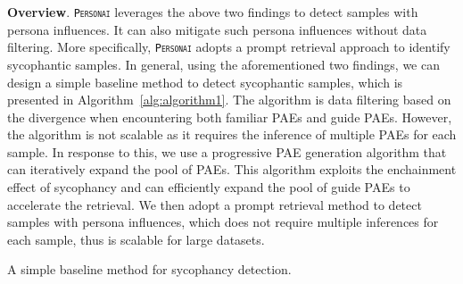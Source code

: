 {\textbf{Overview}. \texttt{\textsc{Personai}} leverages the above two findings to detect samples with persona influences. It can also mitigate such persona influences without data filtering. More specifically, \texttt{\textsc{Personai}} adopts a prompt retrieval approach to identify sycophantic samples. In general, using the aforementioned two findings, we can design a simple baseline method to detect sycophantic samples, which is presented in Algorithm~\ref{alg:algorithm1}. The algorithm is data filtering based on the divergence when encountering both familiar PAEs and guide PAEs. However, the algorithm is not scalable as it requires the inference of multiple PAEs for each sample. In response to this, we use a progressive PAE generation algorithm that can iteratively expand the pool of PAEs. This algorithm exploits the enchainment effect of sycophancy and can efficiently expand the pool of guide PAEs to accelerate the retrieval. We then adopt a prompt retrieval method to detect samples with persona influences, which does not require multiple inferences for each sample, thus is scalable for large datasets. 
\begin{algorithm}[!t]
\SetNoFillInSpace
\SetAlgoVspace{0.1 cm}
\SetNColorOnly
  \LinesNumbered
  \caption{ A simple baseline method for sycophancy detection.}
  \label{alg:algorithm1}
\end{algorithm}

}
